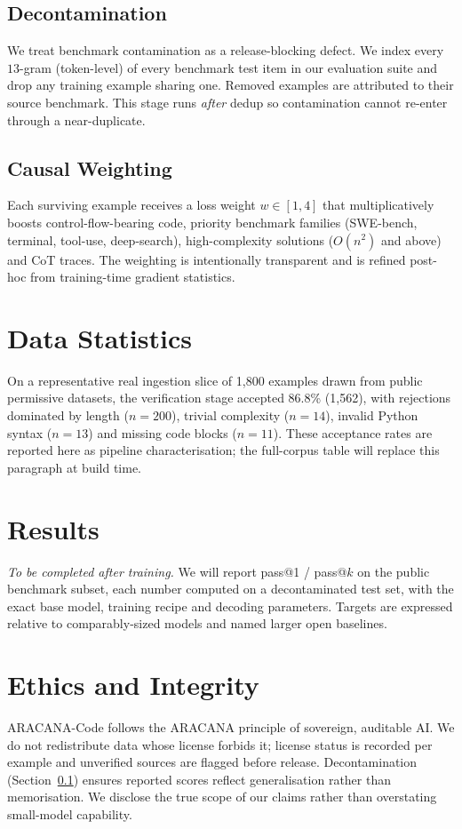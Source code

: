 \documentclass[11pt]{article}
\begin{document}
\subsection{Decontamination}
\label{sec:decon}
We treat benchmark contamination as a release-blocking defect. We index every
$13$-gram (token-level) of every benchmark test item in our evaluation suite and
drop any training example sharing one. Removed examples are attributed to their
source benchmark. This stage runs \emph{after} dedup so contamination cannot
re-enter through a near-duplicate.

\subsection{Causal Weighting}
Each surviving example receives a loss weight
\(w \in [1, 4]\) that multiplicatively boosts control-flow-bearing code,
priority benchmark families (SWE-bench, terminal, tool-use, deep-search),
high-complexity solutions ($O(n^2)$ and above) and CoT traces. The weighting is
intentionally transparent and is refined post-hoc from training-time gradient
statistics.

\section{Data Statistics}
\label{sec:stats}
On a representative real ingestion slice of 1{,}800 examples drawn from public
permissive datasets, the verification stage accepted 86.8\% (1{,}562), with
rejections dominated by length ($n{=}200$), trivial complexity ($n{=}14$),
invalid Python syntax ($n{=}13$) and missing code blocks ($n{=}11$). These
acceptance rates are reported here as pipeline characterisation; the full-corpus
table will replace this paragraph at build time.

\section{Results}
\label{sec:results}
\emph{To be completed after training.} We will report pass@1 / pass@$k$ on the
public benchmark subset, each number computed on a decontaminated test set, with
the exact base model, training recipe and decoding parameters. Targets are
expressed relative to comparably-sized models and named larger open baselines.

\section{Ethics and Integrity}
ARACANA-Code follows the ARACANA principle of sovereign, auditable AI. We do not
redistribute data whose license forbids it; license status is recorded per
example and unverified sources are flagged before release. Decontamination
(Section~\ref{sec:decon}) ensures reported scores reflect generalisation rather
than memorisation. We disclose the true scope of our claims rather than
overstating small-model capability.
\end{document}
